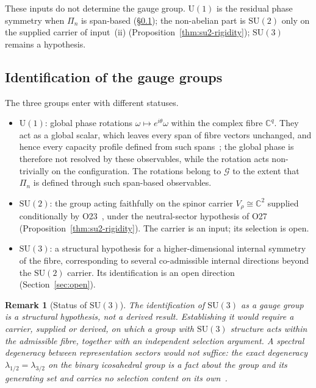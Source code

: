 \documentclass[11pt,a4paper]{article}
\newtheorem{remark}[theorem]{Remark}
\begin{document}
    These inputs do not determine the gauge group.
    $\mathrm{U}(1)$ is the residual phase symmetry when $\Pi_n$ is span-based (§\ref{subsec:identification}); the
    non-abelian part is $\mathrm{SU}(2)$ only on the supplied carrier of input~(ii)
    (Proposition~\ref{thm:su2-rigidity}); $\mathrm{SU}(3)$ remains a hypothesis.

  \subsection{Identification of the gauge groups}
    \label{subsec:identification}

    The three groups enter with different statuses.

    \begin{itemize}
      \item \emph{$\mathrm{U}(1)$}: global phase rotations
      $\omega \mapsto e^{i\theta}\omega$ within the complex fibre $\mathbb{C}^q$.
      They act as a global scalar, which leaves every span of fibre vectors unchanged, and
      hence every capacity profile defined from such spans~\cite{Beau2026a16}; the global
      phase is therefore not resolved by these observables, while the rotation acts
      non-trivially on the configuration.
      The rotations belong to $\mathcal{G}$ to the extent that $\Pi_n$ is defined through such
      span-based observables.

      \item \emph{$\mathrm{SU}(2)$}: the group acting faithfully on the spinor carrier
      $V_\rho \cong \mathbb{C}^2$ supplied conditionally by O23~\cite{Beau2026a27}, under the
      neutral-sector hypothesis of O27~\cite{Beau2026a31}
      (Proposition~\ref{thm:su2-rigidity}).
      The carrier is an input; its selection is open.

      \item \emph{$\mathrm{SU}(3)$}: a structural hypothesis for a higher-dimensional
      internal symmetry of the fibre, corresponding to several co-admissible internal
      directions beyond the $\mathrm{SU}(2)$ carrier.
      Its identification is an open direction (Section~\ref{sec:open}).
    \end{itemize}

    \begin{remark}[Status of $\mathrm{SU}(3)$]
        The identification of $\mathrm{SU}(3)$ as a gauge group is a structural
        hypothesis, not a derived result.
        Establishing it would require a carrier, supplied or derived, on which a group with
        $\mathrm{SU}(3)$ structure acts within the admissible fibre, together with an
        independent selection argument.
        A spectral degeneracy between representation sectors would not suffice: the exact
        degeneracy $\lambda_{1/2} = \lambda_{3/2}$ on the binary icosahedral group is a fact
        about the group and its generating set and carries no selection content on its
        own~\cite{Beau2026q2}.
    \end{remark}
\end{document}
